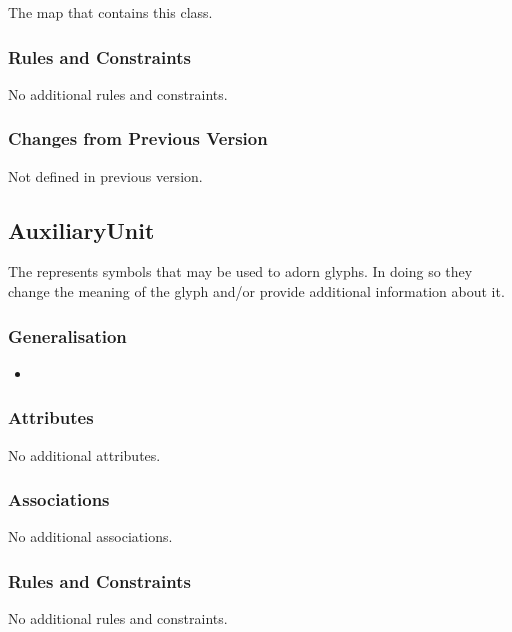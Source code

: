 \begin{attributes}
 The map that contains this class.
\end{attributes}

\subsubsection{Rules and Constraints}

No additional rules and constraints.

\subsubsection{Changes from Previous Version}

Not defined in  previous version.


\subsection{AuxiliaryUnit}

The  represents symbols that may be used to
adorn glyphs. In doing so they change the meaning of the glyph and/or provide
additional information about it.

\subsubsection{Generalisation}

\begin{itemize}
\item {}
\end{itemize}

\subsubsection{Attributes}

No additional attributes.

\subsubsection{Associations}

No additional associations.

\subsubsection{Rules and Constraints}

No additional rules and constraints.

